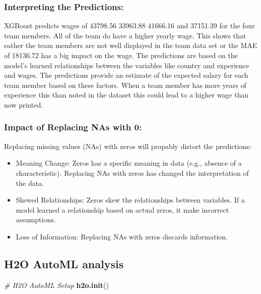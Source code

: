 \documentclass[
]{article}
\newenvironment{Shaded}{\begin{snugshade}}{\end{snugshade}}
\newcommand{\CommentTok}[1]{\textcolor[rgb]{0.56,0.35,0.01}{\textit{#1}}}
\newcommand{\FunctionTok}[1]{\textcolor[rgb]{0.13,0.29,0.53}{\textbf{#1}}}
\newcommand{\NormalTok}[1]{#1}
\providecommand{\tightlist}{%
  \setlength{\itemsep}{0pt}\setlength{\parskip}{0pt}}
\begin{document}
\subsubsection{Interpreting the
Predictions:}\label{interpreting-the-predictions}

XGBoost predicts wages of 43798.56 33963.88 41666.16 and 37151.39 for
the four team members. All of the team do have a higher yearly wage.
This shows that eather the team members are not well displayed in the
team data set or the MAE of 18136.72 has a big impact on the wage. The
predictions are based on the model's learned relationships between the
variables like country and experience and wages. The predictions provide
an estimate of the expected salary for each team member based on these
factors. When a team member has more years of experience this than noted
in the dataset this could lead to a higher wage than now printed.

\subsubsection{Impact of Replacing NAs with
0:}\label{impact-of-replacing-nas-with-0}

Replacing missing values (NAs) with zeros will propably distort the
predictions:

\begin{itemize}
\tightlist
\item
  Meaning Change: Zeros has a specific meaning in data (e.g., absence of
  a characteristic). Replacing NAs with zeros has changed the
  interpretation of the data.
\item
  Skewed Relationships: Zeros skew the relationships between variables.
  If a model learned a relationship based on actual zeros, it make
  incorrect assumptions.
\item
  Loss of Information: Replacing NAs with zeros discards information.
\end{itemize}

\subsection{H2O AutoML analysis}\label{h2o-automl-analysis}

\begin{Shaded}
\begin{Highlighting}[]
\CommentTok{\# H2O AutoML Setup}
\FunctionTok{h2o.init}\NormalTok{()}
\end{Highlighting}
\end{Shaded}
\end{document}
